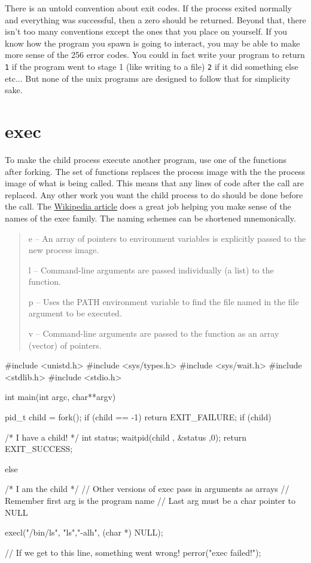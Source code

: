 There is an untold convention about exit codes. If the process exited normally and everything was successful, then a zero should be returned. Beyond that, there isn't too many conventions except the ones that you place on yourself. If you know how the program you spawn is going to interact, you may be able to make more sense of the 256 error codes. You could in fact write your program to return \texttt{1} if the program went to stage 1 (like writing to a file) \texttt{2} if it did something else etc... But none of the unix programs are designed to follow that for simplicity sake.

\section{exec}

To make the child process execute another program, use one of the \href{http://man7.org/linux/man-pages/man3/exec.3.html}{} functions after forking. The  set of functions replaces the process image with the the process image of what is being called. This means that any lines of code after the  call are replaced. Any other work you want the child process to do should be done before the  call. The \href{https://en.wikipedia.org/wiki/Exec_(system_call)\#C_language_prototypes}{Wikipedia article} does a great job helping you make sense of the names of the exec family. The naming schemes can be shortened mnemonically.

\begin{quote}
e -- An array of pointers to environment variables is explicitly passed to the new process image.

l -- Command-line arguments are passed individually (a list) to the function.

p -- Uses the PATH environment variable to find the file named in the file argument to be executed.

v -- Command-line arguments are passed to the function as an array (vector) of pointers.
\end{quote}

\begin{code}[language=C]
#include <unistd.h>
#include <sys/types.h> 
#include <sys/wait.h>
#include <stdlib.h>
#include <stdio.h>

int main(int argc, char**argv) {
  pid_t child = fork();
  if (child == -1) return EXIT_FAILURE;
  if (child) { /* I have a child! */
    int status;
    waitpid(child , &status ,0);
    return EXIT_SUCCESS;

  } else { /* I am the child */
    // Other versions of exec pass in arguments as arrays
    // Remember first arg is the program name
    // Last arg must be a char pointer to NULL

    execl("/bin/ls", "ls","-alh", (char *) NULL);

    // If we get to this line, something went wrong!
    perror("exec failed!");
  }
}
\end{code}

